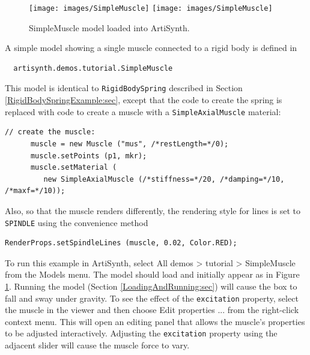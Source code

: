 \begin{figure}[ht]
\begin{center}
\iflatexml
 \texttt{[image: images/SimpleMuscle]}
\else
 \texttt{[image: images/SimpleMuscle]}
\fi
\end{center}
\caption{SimpleMuscle model loaded into ArtiSynth.}
\label{SimpleMuscle:fig}
\end{figure}

A simple model showing a single muscle connected to a rigid
body is defined in
%
\begin{verbatim}
  artisynth.demos.tutorial.SimpleMuscle
\end{verbatim}
%

This model is identical to {\tt RigidBodySpring} described in Section
\ref{RigidBodySpringExample:sec}, except that the code to create
the spring is replaced with code to create a muscle
with a {\tt SimpleAxialMuscle} material:
%
\begin{lstlisting}[]
      // create the muscle:      
      muscle = new Muscle ("mus", /*restLength=*/0);
      muscle.setPoints (p1, mkr);
      muscle.setMaterial (
         new SimpleAxialMuscle (/*stiffness=*/20, /*damping=*/10, /*maxf=*/10));
\end{lstlisting}
%
Also, so that the muscle renders differently, the rendering style
for lines is set to {\tt SPINDLE} using the convenience method
%
\begin{lstlisting}[]
      RenderProps.setSpindleLines (muscle, 0.02, Color.RED);
\end{lstlisting}
%

To run this example in ArtiSynth, select {\sf All demos > tutorial >
SimpleMuscle} from the {\sf Models} menu. The model should load and
initially appear as in Figure \ref{SimpleMuscle:fig}.  Running the
model (Section \ref{LoadingAndRunning:sec}) will cause the box to fall
and sway under gravity. To see the effect of the {\tt excitation}
property, select the muscle in the viewer and then choose {\sf Edit
properties ...} from the right-click context menu.  This will open an
editing panel that allows the muscle's properties to be adjusted
interactively. Adjusting the {\tt excitation} property using the
adjacent slider will cause the muscle force to vary.



